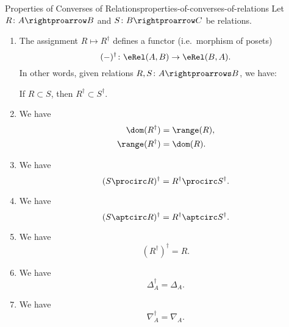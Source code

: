 \begin{proposition}{Properties of Converses of Relations}{properties-of-converses-of-relations}%
    Let $R\colon A\rightproarrow B$ and $S\colon B\rightproarrow C$ be relations.
    \begin{enumerate}
        \item\label{properties-of-converses-of-relations-functoriality}The assignment $R\mapsto R^{\dagger}$ defines a functor (i.e.\ morphism of posets)
            \[
                (-)^{\dagger}%
                \colon%
                \eRel(A,B)%
                \to%
                \eRel(B,A).%
            \]%
            In other words, given relations $R,S\colon A\rightproarrows B$, we have:
            \begin{itemize}
                \itemstar If $R\subset S$, then $R^{\dagger}\subset S^{\dagger}$.
            \end{itemize}
        \item\label{properties-of-converses-of-relations-interaction-with-ranges-and-domains}We have
            \begin{align*}
                \dom(R^{\dagger})   &= \range(R),\\
                \range(R^{\dagger}) &= \dom(R).
            \end{align*}
        \item\label{properties-of-converses-of-relations-interaction-with-composition}We have
            \[
                (S\procirc R)^{\dagger}
                =
                R^{\dagger}\procirc S^{\dagger}.
            \]%
        \item\label{properties-of-converses-of-relations-interaction-with-apartness-composition}We have
            \[
                (S\aptcirc R)^{\dagger}
                =
                R^{\dagger}\aptcirc S^{\dagger}.
            \]%
        \item\label{properties-of-converses-of-relations-invertibility}We have
            \[
                (R^{\dagger})^{\dagger}
                =
                R.
            \]%
        \item\label{properties-of-converses-of-relations-identity-1}We have
            \[
                \Delta^{\dagger}_{A}
                =
                \Delta_{A}.
            \]%
        \item\label{properties-of-converses-of-relations-identity-2}We have
            \[
                \nabla^{\dagger}_{A}
                =
                \nabla_{A}.
            \]%
    \end{enumerate}
\end{proposition}
